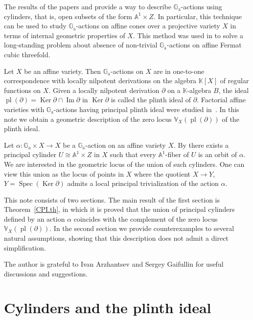 \documentclass[a4paper, 12pt, reqno]{amsart}
\newcommand{\bb}{\mathbb}
\newcommand{\der}{\partial}
\newcommand{\Ga}{\bb{G}_\mathrm{a}}
\DeclareMathOperator{\mIm}{Im}
\renewcommand{\Im}{\mIm}
\DeclareMathOperator{\Ker}{Ker}
\DeclareMathOperator{\pl}{pl}
\DeclareMathOperator{\Spec}{Spec}
\theoremstyle{definition}
\theoremstyle{plain}
\begin{document}
The results of the papers \cite{KPZ11} and \cite{KPZ13} provide a way to describe $\Ga$-actions using cylinders, that is, open subsets of the form $\bb{A}^1 \times Z$. In particular, this technique can be used to study
\linebreak
$\Ga$-actions on affine cones over a projective variety $X$ in terms of internal geometric properties of $X$. This method was used in \cite{CPW16} to solve a long-standing problem about absence of non-trivial $\Ga$-actions on affine Fermat cubic threefold.

Let $X$ be an affine variety. Then $\Ga$-actions on $X$ are in one-to-one correspondence with locally nilpotent derivations on the algebra $\bb{K}[X]$ of regular functions on $X$. Given a locally nilpotent derivation $\der$ on a $\bb{K}$-algebra $B$, the ideal $\pl(\der) = \Ker \der \cap \Im \der$ in $\Ker \der$ is called the plinth ideal of $\der$. Factorial affine varieties with $\Ga$-actions having principal plinth ideal were studied in~\cite{Ma23}. In this note we obtain a geometric description of the zero locus $\bb{V}_X(\pl(\der))$ of the plinth ideal.

Let $\alpha \colon \Ga \times X \to X$ be a $\Ga$-action on an affine variety $X$. By \cite[Proposition~3.1.5]{KPZ11} there exists a principal cylinder $U \cong \bb{A}^1 \times Z$ in $X$ such that every $\bb{A}^1$-fiber of $U$ is an orbit of $\alpha$. We are interested in the geometric locus of the union of such cylinders. One can view this union as the locus of points in $X$ where the quotient $X \to Y$, $Y = \Spec(\Ker \der)$ admits a local principal trivialization of the action $\alpha$.

This note consists of two sections. The main result of the first section is Theorem~\ref{CPI.th}, in which it is proved that the union of principal cylinders defined by an action $\alpha$ coincides with the complement of the zero locus $\bb{V}_X(\pl(\der))$. In the second section we provide counterexamples to several natural assumptions, showing that this description does not admit a direct simplification.

The author is grateful to Ivan Arzhantsev and Sergey Gaifullin for useful discussions and suggestions.


\section{Cylinders and the plinth ideal}
\end{document}
